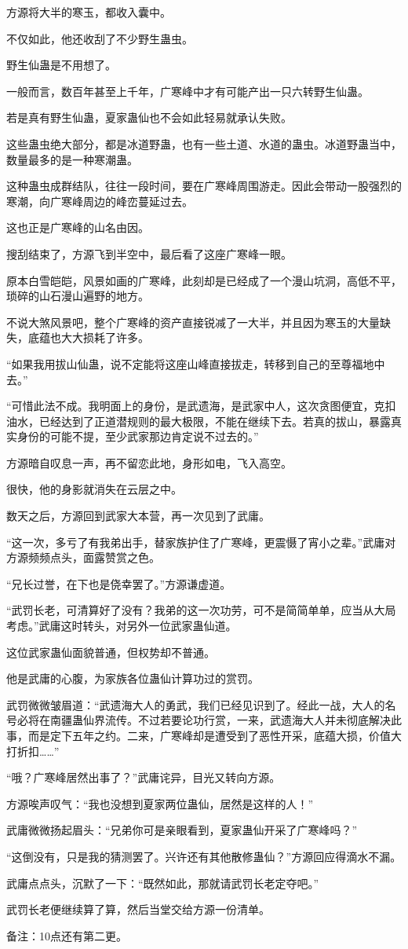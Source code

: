 \begin{this_body}
方源将大半的寒玉，都收入囊中。

不仅如此，他还收刮了不少野生蛊虫。

野生仙蛊是不用想了。

一般而言，数百年甚至上千年，广寒峰中才有可能产出一只六转野生仙蛊。

若是真有野生仙蛊，夏家蛊仙也不会如此轻易就承认失败。

这些蛊虫绝大部分，都是冰道野蛊，也有一些土道、水道的蛊虫。冰道野蛊当中，数量最多的是一种寒潮蛊。

这种蛊虫成群结队，往往一段时间，要在广寒峰周围游走。因此会带动一股强烈的寒潮，向广寒峰周边的峰峦蔓延过去。

这也正是广寒峰的山名由因。

搜刮结束了，方源飞到半空中，最后看了这座广寒峰一眼。

原本白雪皑皑，风景如画的广寒峰，此刻却是已经成了一个漫山坑洞，高低不平，琐碎的山石漫山遍野的地方。

不说大煞风景吧，整个广寒峰的资产直接锐减了一大半，并且因为寒玉的大量缺失，底蕴也大大损耗了许多。

“如果我用拔山仙蛊，说不定能将这座山峰直接拔走，转移到自己的至尊福地中去。”

“可惜此法不成。我明面上的身份，是武遗海，是武家中人，这次贪图便宜，克扣油水，已经达到了正道潜规则的最大极限，不能在继续下去。若真的拔山，暴露真实身份的可能不提，至少武家那边肯定说不过去的。”

方源暗自叹息一声，再不留恋此地，身形如电，飞入高空。

很快，他的身影就消失在云层之中。

数天之后，方源回到武家大本营，再一次见到了武庸。

“这一次，多亏了有我弟出手，替家族护住了广寒峰，更震慑了宵小之辈。”武庸对方源频频点头，面露赞赏之色。

“兄长过誉，在下也是侥幸罢了。”方源谦虚道。

“武罚长老，可清算好了没有？我弟的这一次功劳，可不是简简单单，应当从大局考虑。”武庸这时转头，对另外一位武家蛊仙道。

这位武家蛊仙面貌普通，但权势却不普通。

他是武庸的心腹，为家族各位蛊仙计算功过的赏罚。

武罚微微皱眉道：“武遗海大人的勇武，我们已经见识到了。经此一战，大人的名号必将在南疆蛊仙界流传。不过若要论功行赏，一来，武遗海大人并未彻底解决此事，而是定下五年之约。二来，广寒峰却是遭受到了恶性开采，底蕴大损，价值大打折扣……”

“哦？广寒峰居然出事了？”武庸诧异，目光又转向方源。

方源唉声叹气：“我也没想到夏家两位蛊仙，居然是这样的人！”

武庸微微扬起眉头：“兄弟你可是亲眼看到，夏家蛊仙开采了广寒峰吗？”

“这倒没有，只是我的猜测罢了。兴许还有其他散修蛊仙？”方源回应得滴水不漏。

武庸点点头，沉默了一下：“既然如此，那就请武罚长老定夺吧。”

武罚长老便继续算了算，然后当堂交给方源一份清单。

备注：10点还有第二更。

\end{this_body}

